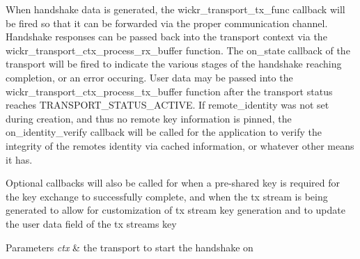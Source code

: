 When handshake data is generated, the \textquotesingle{}wickr\+\_\+transport\+\_\+tx\+\_\+func\textquotesingle{} callback will be fired so that it can be forwarded via the proper communication channel. Handshake responses can be passed back into the transport context via the \textquotesingle{}wickr\+\_\+transport\+\_\+ctx\+\_\+process\+\_\+rx\+\_\+buffer\textquotesingle{} function. The \textquotesingle{}on\+\_\+state\textquotesingle{} callback of the transport will be fired to indicate the various stages of the handshake reaching completion, or an error occuring. User data may be passed into the \textquotesingle{}wickr\+\_\+transport\+\_\+ctx\+\_\+process\+\_\+tx\+\_\+buffer\textquotesingle{} function after the transport status reaches \textquotesingle{}T\+R\+A\+N\+S\+P\+O\+R\+T\+\_\+\+S\+T\+A\+T\+U\+S\+\_\+\+A\+C\+T\+I\+VE\textquotesingle{}. If \textquotesingle{}remote\+\_\+identity\textquotesingle{} was not set during creation, and thus no remote key information is pinned, the \textquotesingle{}on\+\_\+identity\+\_\+verify\textquotesingle{} callback will be called for the application to verify the integrity of the remote\textquotesingle{}s identity via cached information, or whatever other means it has.

Optional callbacks will also be called for when a pre-\/shared key is required for the key exchange to successfully complete, and when the tx stream is being generated to allow for customization of tx stream key generation and to update the user data field of the tx stream\textquotesingle{}s key


\begin{DoxyParams}{Parameters}
{\em ctx} & the transport to start the handshake on \\
\hline
\end{DoxyParams}
